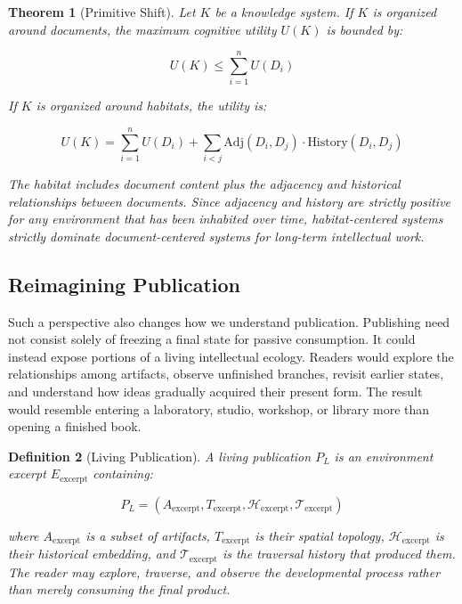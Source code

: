 \documentclass[12pt,oneside]{article}
\newtheorem{definition}{Definition}[section]
\newtheorem{theorem}[definition]{Theorem}
\theoremstyle{remark}
\begin{document}
\begin{theorem}[Primitive Shift]
Let $K$ be a knowledge system. If $K$ is organized around documents, the maximum cognitive utility $U(K)$ is bounded by:

\begin{equation}
U(K) \leq \sum_{i=1}^{n} U(D_i)
\end{equation}

If $K$ is organized around habitats, the utility is:

\begin{equation}
U(K) = \sum_{i=1}^{n} U(D_i) + \sum_{i<j} \text{Adj}(D_i, D_j) \cdot \text{History}(D_i, D_j)
\end{equation}

The habitat includes document content plus the adjacency and historical relationships between documents. Since adjacency and history are strictly positive for any environment that has been inhabited over time, habitat-centered systems strictly dominate document-centered systems for long-term intellectual work.
\end{theorem}

\subsection{Reimagining Publication}

Such a perspective also changes how we understand publication. Publishing need not consist solely of freezing a final state for passive consumption. It could instead expose portions of a living intellectual ecology. Readers would explore the relationships among artifacts, observe unfinished branches, revisit earlier states, and understand how ideas gradually acquired their present form. The result would resemble entering a laboratory, studio, workshop, or library more than opening a finished book.

\begin{definition}[Living Publication]
A living publication $P_L$ is an environment excerpt $E_{\text{excerpt}}$ containing:

\begin{equation}
P_L = (A_{\text{excerpt}}, T_{\text{excerpt}}, \mathcal{H}_{\text{excerpt}}, \mathcal{T}_{\text{excerpt}})
\end{equation}

where $A_{\text{excerpt}}$ is a subset of artifacts, $T_{\text{excerpt}}$ is their spatial topology, $\mathcal{H}_{\text{excerpt}}$ is their historical embedding, and $\mathcal{T}_{\text{excerpt}}$ is the traversal history that produced them. The reader may explore, traverse, and observe the developmental process rather than merely consuming the final product.
\end{definition}
\end{document}

